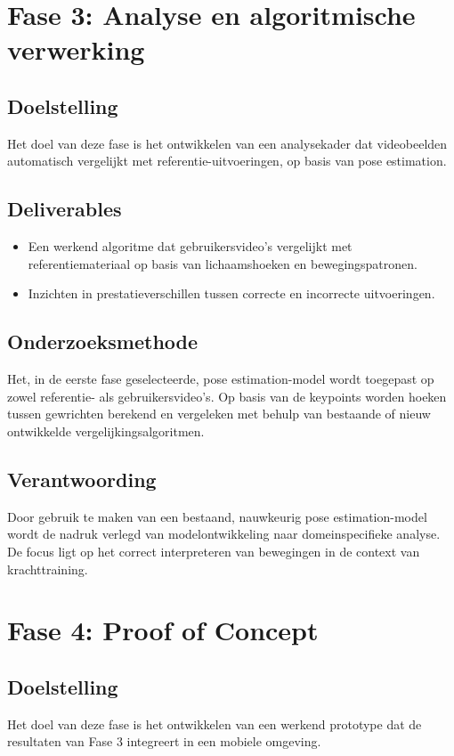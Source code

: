 \section{Fase 3: Analyse en algoritmische verwerking}
\subsection{Doelstelling}
Het doel van deze fase is het ontwikkelen van een analysekader dat videobeelden automatisch vergelijkt met referentie-uitvoeringen, op basis van pose estimation.

\subsection{Deliverables}
\begin{itemize}
    \item Een werkend algoritme dat gebruikersvideo’s vergelijkt met referentiemateriaal op basis van lichaamshoeken en bewegingspatronen.
    \item Inzichten in prestatieverschillen tussen correcte en incorrecte uitvoeringen.
\end{itemize}

\subsection{Onderzoeksmethode}
Het, in de eerste fase geselecteerde, pose estimation-model wordt toegepast op zowel referentie- als gebruikersvideo’s. 
Op basis van de keypoints worden hoeken tussen gewrichten berekend en vergeleken met behulp van bestaande of nieuw ontwikkelde vergelijkingsalgoritmen.

\subsection{Verantwoording}
Door gebruik te maken van een bestaand, nauwkeurig pose estimation-model wordt de nadruk verlegd van modelontwikkeling naar domeinspecifieke analyse. 
De focus ligt op het correct interpreteren van bewegingen in de context van krachttraining.  

\section{Fase 4: Proof of Concept}
\subsection{Doelstelling}
Het doel van deze fase is het ontwikkelen van een werkend prototype dat de resultaten van Fase 3 integreert in een mobiele omgeving.

